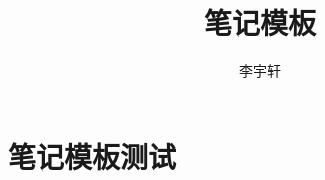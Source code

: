 \documentclass{notebook-neon}
\title{笔记模板}
\author{李宇轩}
\begin{document}
\maketitle

\frontmatter

\makesymb

\tableofcontents
\listoffigures
\listoftables
\lstlistoflistings

\mainmatter

\nocite{*}

\part{笔记模板测试}








\appendix



\backmatter


\end{document}
